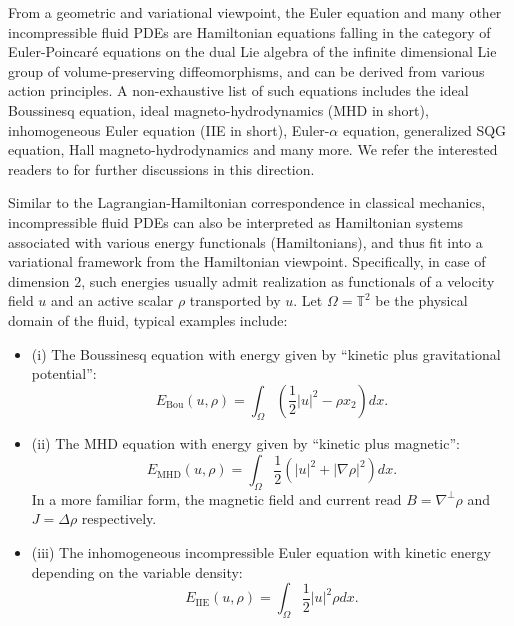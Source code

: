 \documentclass[12pt,letterpaper]{article}
\theoremstyle{plain}
\begin{document}
From a geometric and variational viewpoint, the Euler equation and many other incompressible fluid PDEs are Hamiltonian equations falling in the category of Euler-Poincar\'e equations on the dual Lie algebra of the infinite dimensional Lie group of volume-preserving diffeomorphisms, and can be derived from various action principles. A non-exhaustive list of such equations includes the ideal Boussinesq equation, ideal magneto-hydrodynamics (MHD in short), inhomogeneous Euler equation (IIE in short), Euler-$\alpha$ equation, generalized SQG equation, Hall magneto-hydrodynamics and many more. We refer the interested readers to \cite{Ar66}\cite{AK98}\cite{HMR98}\cite{HSS09}\cite{MR99} for further discussions in this direction. 

Similar to the Lagrangian-Hamiltonian correspondence in classical mechanics, incompressible fluid PDEs can also be interpreted as Hamiltonian systems associated with various energy functionals (Hamiltonians), and thus fit into a variational framework from the  Hamiltonian viewpoint. Specifically, in case of dimension $2$, such energies usually admit realization as functionals of a velocity field $u$ and an active scalar $\rho$ transported by $u$. Let $\Omega=\mathbb T^2$ be the physical domain of the fluid, typical examples include:
\begin{itemize}
    \item (i) The Boussinesq equation with energy given by ``kinetic plus gravitational potential'':
    \begin{equation*}
     E_{\text{Bou}}(u,\rho)=\int_{\Omega}(\frac{1}{2}\lvert u\rvert^2-\rho x_2) dx.   
    \end{equation*}
    \item (ii) The MHD equation with energy given by ``kinetic plus magnetic'':
    \begin{equation}
        E_{\text{MHD}}(u,\rho)=\int_{\Omega}\frac{1}{2}(\lvert u\rvert^2+\lvert\nabla\rho\vert^2) dx.
    \end{equation}
    In a more familiar form, the magnetic field and current read $B=\nabla^\perp\rho$ and  $J=\Delta\rho$ respectively.

    \item (iii) The inhomogeneous incompressible Euler equation with kinetic energy depending on the variable density:
    \begin{equation}
        E_{\text{IIE}}(u,\rho)=\int_{\Omega}\frac{1}{2}\lvert u\rvert^2\rho dx.
    \end{equation}
\end{itemize}
\end{document}
